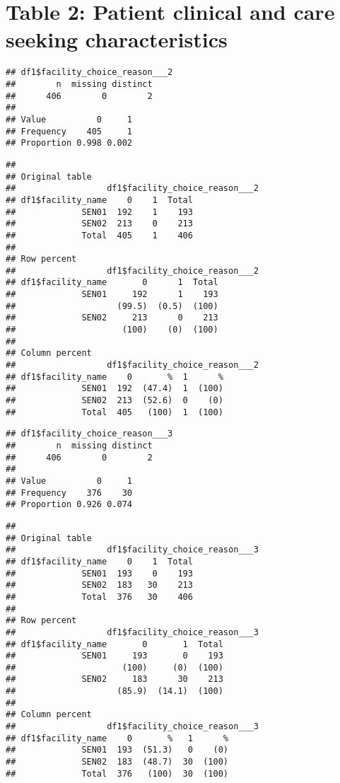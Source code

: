 \documentclass[
]{article}
\begin{document}
\hypertarget{table-2-patient-clinical-and-care-seeking-characteristics}{%
\section{Table 2: Patient clinical and care seeking
characteristics}\label{table-2-patient-clinical-and-care-seeking-characteristics}}

\begin{verbatim}
## df1$facility_choice_reason___2 
##        n  missing distinct 
##      406        0        2 
##                       
## Value          0     1
## Frequency    405     1
## Proportion 0.998 0.002
\end{verbatim}

\begin{verbatim}
## 
## Original table 
##                  df1$facility_choice_reason___2
## df1$facility_name    0    1  Total
##             SEN01  192    1    193
##             SEN02  213    0    213
##             Total  405    1    406
## 
## Row percent 
##                  df1$facility_choice_reason___2
## df1$facility_name       0      1  Total
##             SEN01     192      1    193
##                    (99.5)  (0.5)  (100)
##             SEN02     213      0    213
##                     (100)    (0)  (100)
## 
## Column percent 
##                  df1$facility_choice_reason___2
## df1$facility_name    0       %  1      %
##             SEN01  192  (47.4)  1  (100)
##             SEN02  213  (52.6)  0    (0)
##             Total  405   (100)  1  (100)
\end{verbatim}

\begin{verbatim}
## df1$facility_choice_reason___3 
##        n  missing distinct 
##      406        0        2 
##                       
## Value          0     1
## Frequency    376    30
## Proportion 0.926 0.074
\end{verbatim}

\begin{verbatim}
## 
## Original table 
##                  df1$facility_choice_reason___3
## df1$facility_name    0    1  Total
##             SEN01  193    0    193
##             SEN02  183   30    213
##             Total  376   30    406
## 
## Row percent 
##                  df1$facility_choice_reason___3
## df1$facility_name       0       1  Total
##             SEN01     193       0    193
##                     (100)     (0)  (100)
##             SEN02     183      30    213
##                    (85.9)  (14.1)  (100)
## 
## Column percent 
##                  df1$facility_choice_reason___3
## df1$facility_name    0       %   1      %
##             SEN01  193  (51.3)   0    (0)
##             SEN02  183  (48.7)  30  (100)
##             Total  376   (100)  30  (100)
\end{verbatim}
\end{document}
